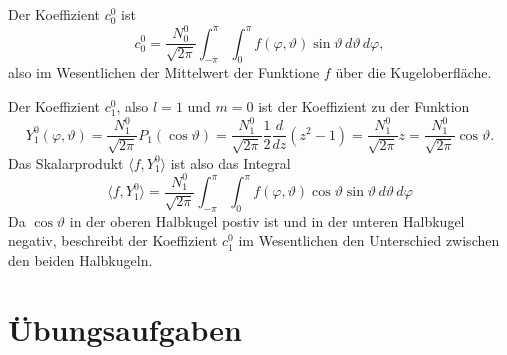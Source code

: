 Der Koeffizient $c_0^0$ ist
\[
c_0^0
=
\frac{N^0_0}{\sqrt{2\pi}}
\int_{-\pi}^\pi 
\int_0^\pi
f(\varphi,\vartheta)
\sin\vartheta
\,d\vartheta
\,d\varphi,
\]
also im Wesentlichen der Mittelwert der Funktione $f$ über die Kugeloberfläche.

Der Koeffizient $c^0_1$, also $l=1$ und $m=0$ ist der Koeffizient
zu der Funktion
\[
Y^0_1(\varphi,\vartheta)
=
\frac{N^0_1}{\sqrt{2\pi}} P_1(\cos\vartheta)
=
\frac{N^0_1}{\sqrt{2\pi}} \frac{1}{2}\frac{d}{dz}(z^2-1)
=
\frac{N^0_1}{\sqrt{2\pi}} z
=
\frac{N^0_1}{\sqrt{2\pi}} \cos\vartheta.
\]
Das Skalarprodukt $\langle f,Y^0_1\rangle$ ist also das
Integral
\[
\langle f,Y^0_1\rangle
=
\frac{N^0_1}{\sqrt{2\pi}}
\int_{-\pi}^\pi 
\int_0^\pi
f(\varphi,\vartheta)
\cos\vartheta
\sin\vartheta
\,d\vartheta
\,d\varphi
\]
Da $\cos\vartheta$ in der oberen Halbkugel postiv ist und in der 
unteren Halbkugel negativ, beschreibt der Koeffizient $c^0_1$ im
Wesentlichen den Unterschied zwischen den beiden Halbkugeln.

\section*{Übungsaufgaben}











